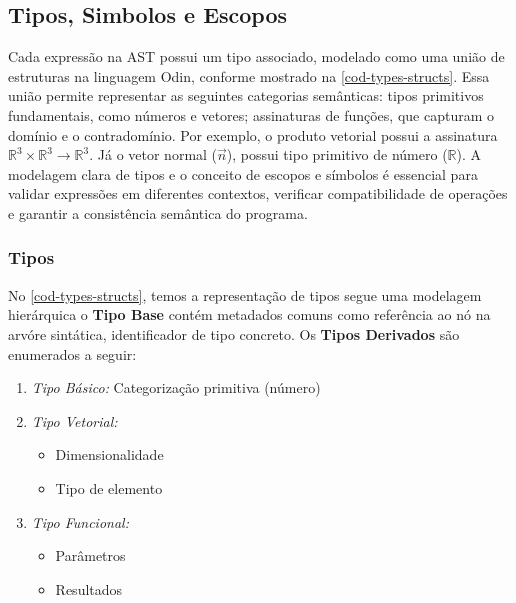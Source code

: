 \subsection{Tipos, Simbolos e Escopos} \label{subsection-symbols-scopes}

Cada expressão na AST possui um tipo associado, modelado como uma união de estruturas na linguagem Odin, conforme mostrado na \autoref{cod-types-structs}. Essa união permite representar as seguintes categorias semânticas: tipos primitivos fundamentais, como números e vetores; assinaturas de funções, que capturam o domínio e o contradomínio. Por exemplo, o produto vetorial possui a assinatura $\mathbb{R}^3 \times \mathbb{R}^3 \to \mathbb{R}^3$. Já o vetor normal ($\vec{n}$), possui tipo primitivo de número ($\mathbb{R}$). A modelagem clara de tipos e o conceito de escopos e símbolos é essencial para validar expressões em diferentes contextos, verificar compatibilidade de operações e garantir a consistência semântica do programa.


\subsubsection{Tipos}
No \autoref{cod-types-structs}, temos a representação de tipos segue uma modelagem hierárquica o \textbf{Tipo Base} contém metadados comuns
como referência ao nó na arvóre sintática, identificador de tipo concreto. Os \textbf{Tipos Derivados} são enumerados a seguir:

\begin{enumerate}
    \item \textit{Tipo Básico:} Categorização primitiva (número)
    \item \textit{Tipo Vetorial:}
    \begin{itemize}
        \item Dimensionalidade
        \item Tipo de elemento
    \end{itemize}
    \item \textit{Tipo Funcional:}
    \begin{itemize}
        \item Parâmetros
        \item Resultados
    \end{itemize}
\end{enumerate}

